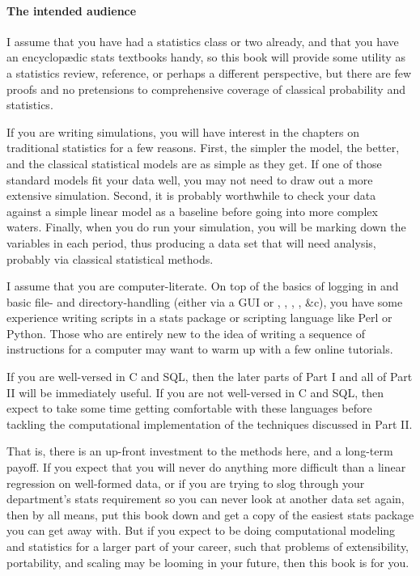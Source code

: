 \paragraph{The intended audience}
I assume that you have had a statistics class or two already, and that
you have an encyclop\ae{}dic stats textbooks handy, so this book will
provide some utility as a statistics review, reference, or perhaps a
different perspective, but there are few proofs and no pretensions to
comprehensive coverage of classical probability and statistics.

If you are writing simulations, you will have interest in the chapters
on traditional statistics for a few reasons. First, 
the simpler the model, the better, and the classical statistical models
are as simple as they get. If one of those standard models fit your data well, you may not need to
draw out a more extensive simulation. Second, it is probably worthwhile to check
your data against a simple linear model as a baseline before going into
more complex waters. Finally, when you do run your simulation, you will
be marking down the variables in each period, thus producing a data set
that will need analysis, probably via classical statistical methods.

I assume that you are computer-literate. On top of the basics of logging
in and basic file- and directory-handling (either via a GUI or ,
, , , \&c),  you have some experience
writing scripts in a stats package or scripting language like Perl or
Python. Those who are entirely new to the idea of writing a sequence
of instructions for a computer may want to warm up with a few online
tutorials.

If you are well-versed in C and SQL, then the later parts of Part I and
all of Part II will be immediately useful.
If you are not well-versed in C and SQL, then expect to take some time
getting comfortable with these languages before tackling the computational
implementation of the techniques discussed in Part II.

That is, there is an up-front investment to the methods here, and a
long-term payoff. If you expect that you will never do anything more
difficult than a linear regression on well-formed  data, or
if you are trying to slog through your department's stats requirement
so you can never look at another data set again, then by all means, put
this book down and get a copy of the easiest stats package you can
get away with. But if you expect to be doing computational modeling
and statistics for a larger part of your career, such that problems of
extensibility, portability, and scaling may be looming in your future,
then this book is for you.

